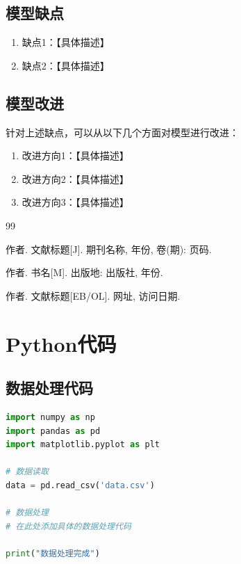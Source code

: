 \documentclass[12pt,a4paper]{ctexart}
\begin{document}
\subsection{模型缺点}
\begin{enumerate}
    \item 缺点1：【具体描述】
    \item 缺点2：【具体描述】
\end{enumerate}

\subsection{模型改进}
针对上述缺点，可以从以下几个方面对模型进行改进：

\begin{enumerate}
    \item 改进方向1：【具体描述】
    \item 改进方向2：【具体描述】
    \item 改进方向3：【具体描述】
\end{enumerate}

\newpage
\begin{thebibliography}{99}

 作者. 文献标题[J]. 期刊名称, 年份, 卷(期): 页码.

 作者. 书名[M]. 出版地: 出版社, 年份.

 作者. 文献标题[EB/OL]. 网址, 访问日期.

\end{thebibliography}

\newpage
\appendix

\section{Python代码}

\subsection{数据处理代码}

\begin{lstlisting}[language=Python, caption=数据处理代码]
import numpy as np
import pandas as pd
import matplotlib.pyplot as plt

# 数据读取
data = pd.read_csv('data.csv')

# 数据处理
# 在此处添加具体的数据处理代码

print("数据处理完成")
\end{lstlisting}
\end{document}
